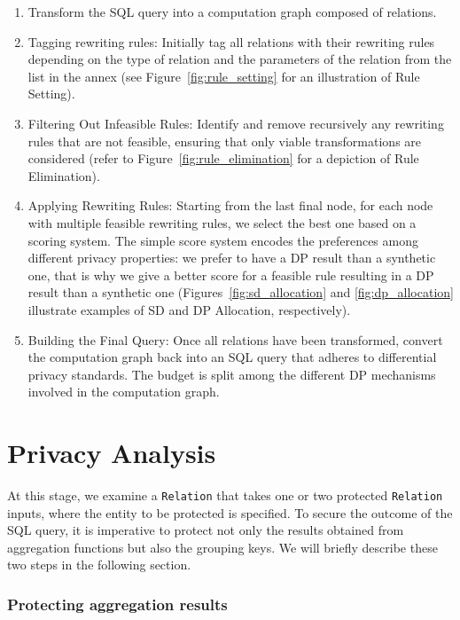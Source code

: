 \documentclass[letterpaper]{article} %
\begin{document}
\begin{enumerate}
    \item Transform the SQL query into a computation graph composed of relations.
    \item Tagging rewriting rules: Initially tag all relations with their rewriting rules depending on the type of relation and the parameters of the relation from the list in the annex (see Figure~\ref{fig:rule_setting} for an illustration of Rule Setting).
    \item Filtering Out Infeasible Rules: Identify and remove recursively any rewriting rules that are not feasible, ensuring that only viable transformations are considered (refer to Figure~\ref{fig:rule_elimination} for a depiction of Rule Elimination).
    \item Applying Rewriting Rules: Starting from the last final node, for each node with multiple feasible rewriting rules, we select the best one based on a scoring system. The simple score system encodes the preferences among different privacy properties: we prefer to have a DP result than a synthetic one, that is why we give a better score for a feasible rule resulting in a DP result than a synthetic one (Figures~\ref{fig:sd_allocation} and \ref{fig:dp_allocation} illustrate examples of SD and DP Allocation, respectively).
    \item Building the Final Query: Once all relations have been transformed, convert the computation graph back into an SQL query that adheres to differential privacy standards. The budget is split among the different DP mechanisms involved in the computation graph.
\end{enumerate}



\section{Privacy Analysis}
\label{sec:privacy_algos}

At this stage, we examine a \texttt{Relation} that takes one or two protected \texttt{Relation} inputs, where the entity to be protected is specified.
To secure the outcome of the SQL query, it is imperative to protect not only the results obtained from aggregation functions but also the grouping keys.
We will briefly describe these two steps in the following section.

\subsubsection{Protecting aggregation results}
\end{document}
